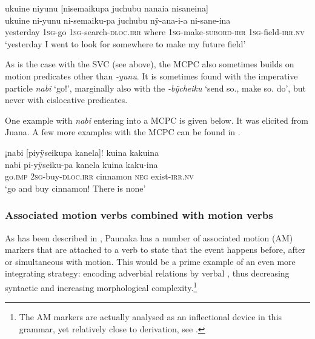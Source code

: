 \ea\label{ex:go-search-field}
\begingl
\glpreamble ukuine niyunu \textup{[}nisemaikupa juchubu nanaia nisaneina\textup{]}\\
\gla ukuine ni-yunu ni-semaiku-pa juchubu nÿ-ana-i-a ni-sane-ina\\
\glb yesterday 1\textsc{sg}-go 1\textsc{sg}-search-\textsc{dloc.irr} where 1\textsc{sg}-make-\textsc{subord}-\textsc{irr} 1\textsc{sg}-field-\textsc{irr.nv}\\
\glft ‘yesterday I went to look for somewhere to make my future field’
\endgl
\trailingcitation{[mxx-e160811sd.152]}
\xe


As is the case with the SVC (see  above), the MCPC also sometimes builds on motion predicates other than \textit{-yunu}. It is sometimes found with the imperative particle \textit{nabi} ‘go!’, marginally also with the  \textit{-bÿcheiku} ‘send so., make so. do’, but never with cislocative predicates.

One example with \textit{nabi} entering into a MCPC is given below. It was elicited from Juana. A few more examples with the MCPC can be found in .

\ea\label{ex:nabi-MCPC}
\begingl
\glpreamble ¡nabi \textup{[}piyÿseikupa kanela\textup{]}! kuina kakuina\\
\gla nabi pi-yÿseiku-pa kanela kuina kaku-ina\\
\glb go.\textsc{imp} 2\textsc{sg}-buy-\textsc{dloc.irr} cinnamon \textsc{neg} exist-\textsc{irr.nv}\\
\glft ‘go and buy cinnamon! There is none’
\endgl
\trailingcitation{[jxx-e191021e-2]}
\xe
{}

\subsubsection{Associated motion verbs combined with motion verbs}\label{sec:AM_MCPC}

As has been described in , Paunaka has a number of associated motion (AM) markers that are attached to a verb to state that the event happens before, after or simultaneous with motion. This would be a prime example of an even more integrating strategy: encoding adverbial relations by verbal , thus decreasing syntactic and increasing morphological complexity.\footnote{The AM markers are actually analysed as an inflectional device in this grammar, yet relatively close to derivation, see .}


